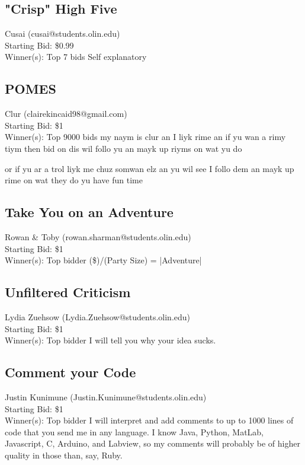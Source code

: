 \documentclass[11pt]{article}
\begin{document}
\subsection{"Crisp" High Five}
Cusai (cusai@students.olin.edu) \\
Starting Bid: \$0.99 \\
Winner(s): 
Top 7 bids\newline
Self explanatory
\subsection{POMES}
Clur (clairekincaid98@gmail.com) \\
Starting Bid: \$1 \\
Winner(s): 
Top 9000 bids\newline
my naym is clur
an I liyk rime
an if yu wan
a rimy tiym
then bid on dis
wil follo yu
an mayk up riyms
on wat yu do

or if yu ar
a trol liyk me
chuz somwan elz
an yu wil see
I follo dem 
an mayk up rime
on wat they do
yu have fun time
\subsection{Take You on an Adventure}
Rowan \& Toby (rowan.sharman@students.olin.edu) \\
Starting Bid: \$1 \\
Winner(s): 
Top bidder\newline
(\$)/(Party Size) = |Adventure|
\subsection{Unfiltered Criticism}
Lydia Zuehsow (Lydia.Zuehsow@students.olin.edu) \\
Starting Bid: \$1 \\
Winner(s): 
Top bidder\newline
I will tell you why your idea sucks.
\subsection{Comment your Code}
Justin Kunimune (Justin.Kunimune@students.olin.edu) \\
Starting Bid: \$1 \\
Winner(s): 
Top bidder\newline
I will interpret and add comments to up to 1000 lines of code that you send me in any language. I know Java, Python, MatLab, Javascript, C, Arduino, and Labview, so my comments will probably be of higher quality in those than, say, Ruby.
\end{document}
